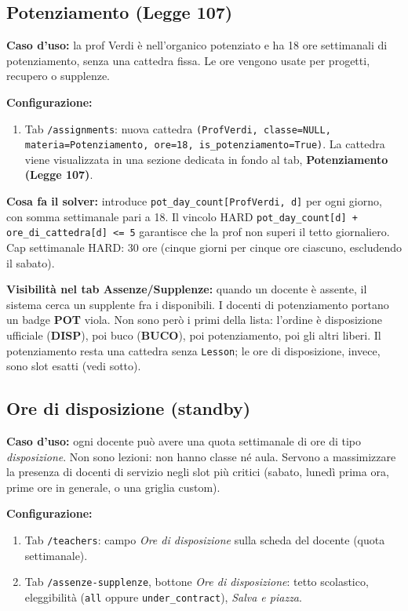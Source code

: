 \subsection{Potenziamento (Legge 107)}

\textbf{Caso d'uso:} la prof Verdi \`e nell'organico
potenziato e ha 18 ore settimanali di potenziamento, senza
una cattedra fissa. Le ore vengono usate per progetti,
recupero o supplenze.

\textbf{Configurazione:}
\begin{enumerate}
\item Tab \texttt{/assignments}: nuova cattedra
\texttt{(ProfVerdi, classe=NULL, materia=Potenziamento,
ore=18, is\_potenziamento=True)}. La cattedra viene
visualizzata in una sezione dedicata in fondo al tab,
\textbf{Potenziamento (Legge 107)}.
\end{enumerate}

\textbf{Cosa fa il solver:} introduce
\texttt{pot\_day\_count[ProfVerdi, d]} per ogni giorno, con
somma settimanale pari a 18. Il vincolo HARD
\texttt{pot\_day\_count[d] + ore\_di\_cattedra[d] <= 5}
garantisce che la prof non superi il tetto giornaliero. Cap
settimanale HARD: 30 ore (cinque giorni per cinque ore
ciascuno, escludendo il sabato).

\textbf{Visibilit\`a nel tab Assenze/Supplenze:} quando un
docente \`e assente, il sistema cerca un supplente fra i
disponibili. I docenti di potenziamento portano un badge
\textbf{POT} viola. Non sono per\`o i primi della lista:
l'ordine \`e disposizione ufficiale (\textbf{DISP}), poi
buco (\textbf{BUCO}), poi potenziamento, poi gli altri
liberi. Il potenziamento resta una cattedra senza
\texttt{Lesson}; le ore di disposizione, invece, sono
slot esatti (vedi sotto).

\subsection{Ore di disposizione (standby)}

\textbf{Caso d'uso:} ogni docente pu\`o avere una quota
settimanale di ore di tipo \emph{disposizione}. Non sono
lezioni: non hanno classe n\'e aula. Servono a massimizzare
la presenza di docenti di servizio negli slot pi\`u
critici (sabato, luned\`i prima ora, prime ore in
generale, o una griglia custom).

\textbf{Configurazione:}
\begin{enumerate}
\item Tab \texttt{/teachers}: campo \emph{Ore di
disposizione} sulla scheda del docente (quota settimanale).
\item Tab \texttt{/assenze-supplenze}, bottone \emph{Ore di
disposizione}: tetto scolastico, eleggibilit\`a
(\texttt{all} oppure \texttt{under\_contract}),
\emph{Salva e piazza}.
\end{enumerate}

